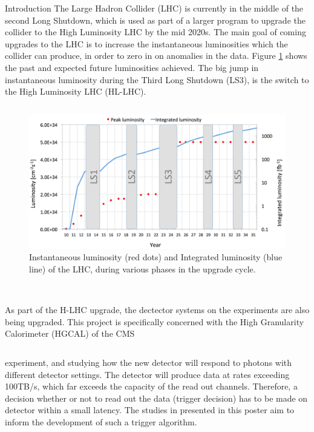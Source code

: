 \documentclass[final,hyperref={pdfpagelabels=false}]{beamer}
\begin{document}
\begin{frame}[t]
\begin{columns}[t]
\begin{column}{.465\textwidth}
\begin{block}{Introduction}
		The Large Hadron Collider (LHC) is currently in the middle of the second Long Shutdown, which is used as part of a larger program to upgrade the collider to the High Luminosity LHC by the mid 2020s. The main goal of coming upgrades to the LHC is to increase the instantaneous luminosities which the collider can produce, in order to zero in on anomalies in the data. Figure \ref*{timeline} shows the past and expected future luminosities achieved. The big jump in instantaneous luminosity during the Third Long Shutdown (LS3), is the switch to the High Luminosity LHC (HL-LHC). 
		\begin{column}{0.6\textwidth}
		\begin{figure}
			\includegraphics[width=\linewidth]{LHC_upgrade_timeplan.png}
				\caption{Instantaneous luminosity (red dots) and Integrated luminosity (blue line) of the LHC, during various phases in the upgrade cycle.}
			\label{timeline}
		\end{figure}
		\end{column}
		\begin{column}{0.01\textwidth}\end{column}
		\begin{column}{0.29\textwidth}
				\\As part of the H-LHC upgrade, the dectector systems on the experiments are also being upgraded. This project is specifically concerned with the High Granularity Calorimeter (HGCAL) of the CMS
		\end{column}

		experiment, and studying how the new detector will respond to photons with different detector settings. The detector will produce data at rates exceeding 100TB/s, which far exceeds the capacity of the read out channels. Therefore, a decision whether or not to read out the data (trigger decision) has to be made on detector within a small latency. The studies in presented in this poster aim to inform the development of such a trigger algorithm.


\end{block}
\end{column}
\end{columns}
\end{frame}
\end{document}

